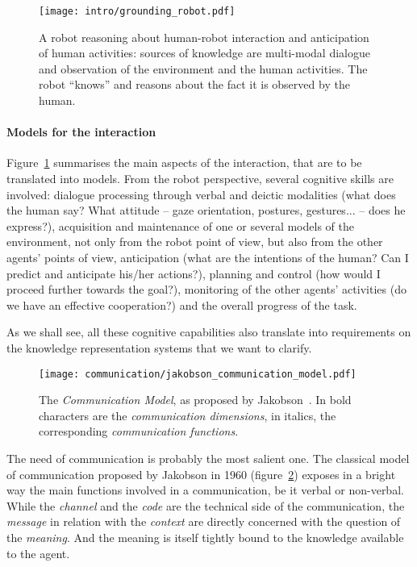 \begin{figure}
    \centering
    \texttt{[image: intro/grounding\_robot.pdf]}
    
    \caption{A robot reasoning about human-robot interaction and anticipation
    of human activities: sources of knowledge are multi-modal dialogue and
    observation of the environment and the human activities. The robot ``knows''
    and reasons about the fact it is observed by the human.}

    \label{fig|hri-dec}
\end{figure}


\paragraph{Models for the interaction} Figure~\ref{fig|hri-dec} summarises the
main aspects of the interaction, that are to be translated into models.  From
the robot perspective, several cognitive skills are involved: dialogue
processing through verbal and deictic modalities (what does the human say? What
attitude -- gaze orientation, postures, gestures... -- does he express?), acquisition
and maintenance of one or several models of the environment, not only from the
robot point of view, but also from the other agents' points of view,
anticipation (what are the intentions of the human? Can I predict and
anticipate his/her actions?), planning and control (how would I proceed further
towards the goal?), monitoring of the other agents' activities (do we have an
effective cooperation?) and the overall progress of the task. 

As we shall see, all these cognitive capabilities also translate into
requirements on the knowledge representation systems that we want to clarify.

\begin{figure}%
\centering
  \texttt{[image: communication/jakobson\_communication\_model.pdf]}

  \caption{The \emph{Communication Model}, as proposed by
  Jakobson~\cite{Jakobson1960}. In bold characters are the \emph{communication
  dimensions}, in italics, the corresponding \emph{communication functions}.}
  
  \label{fig|jakobson_communication_model}
\end{figure}


The need of communication is probably the most salient one. The classical model
of communication proposed by Jakobson in 1960
(figure~\ref{fig|jakobson_communication_model}) exposes in a bright way the
main functions involved in a communication, be it verbal or non-verbal. While
the \emph{channel} and the \emph{code} are the technical side of the
communication, the \emph{message} in relation with the \emph{context} are
directly concerned with the question of the \emph{meaning}. And the meaning is
itself tightly bound to the knowledge available to the agent.

